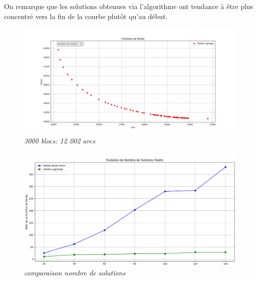 \documentclass[]{article}
\begin{document}
        On remarque que les solutions obtenues via l'algorithme ont tendance à être plus
        concentré vers la fin de la courbe plutôt qu'au début.

        \begin{figure}[H]
            \centering
            \includegraphics[width=1\textwidth]{Résultats/pareto lagrange 3000 blocks.png}
            \caption{\textit{3000 blocs: 12 002 arcs}}
        \end{figure}


        \begin{figure}[H]
            \centering
            \includegraphics[width=1.1\textwidth]{output/lagrange 10 28 brute force 25 380.png}
            \caption{\textit{comparaison nombre de solutions}}
        \end{figure}




        
\end{document}
